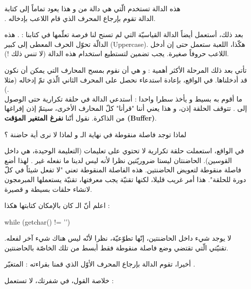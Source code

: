 هذه الدالة تستخدم
الّتي هي دالة من
و هذا يعود تماماً إلى كتابة\\
.
الدالة
تقوم بإرجاع المحرف الذي قام اللاعب بإدخاله.

بعد ذلك، أستعمل أيضاً الدالة القياسيّة التي لم تسنح لنا فرصة تعلّمها في كتابنا :
.
هذه الدالّة تحوّل الحرف المعطى إلى كبير
(\textenglish{Uppercase}).
هكّذا، اللعبة ستعمل حتى إن أدخل اللاعب حروفاً صغيرة. يجب تضمين
لتستطيع استخدام هذه الدالة (لا تنس ذلك !).

تأتي بعد ذلك المرحلة الأكثر أهمية : و هي أن نقوم بمسح المحارف التي يمكن أن نكون قد أدخلناها. في الواقع، بإعادة استدعاء
نحصل على المحرف الثاني الّذي تمّ إدخاله (مثلا
).\\
ما أقوم به بسيط و يأخذ سطرا واحدا : أستدعي الدالة
في حلقة تكرارية حتى الوصول إلى
.
تتوقف الحلقة إذن، و هذا يعني أننا "قرأنا" كلّ المحارف الأخرى، سيتمّ إذن إفراغها من الذاكرة. نقول أنّنا
\textbf{نفرغ المتغير المؤقت
(\textenglish{Buffer})}.

\begin{question}
لماذا توجد فاصلة منقوطة في نهاية الـ
و لماذا لا نرى أية حاضنة ؟
\end{question}

في الواقع، استعملت حلقة تكرارية لا تحتوي على تعليمات (التعليمة الوحيدة، هي
داخل القوسين). الحاضنتان ليستا ضروريّتين نظرا لأنه ليس لدينا ما نفعله غير
.
لهذا أضع فاصلة منقوطة لتعويض الحاضنتين. هذه الفاصلة المنقوطة تعني "لا تفعل شيئاً في كلّ دورة للحلقة". هذا أمر غريب قليلا، لكنها تقنيّة يجب معرفتها، تقنيّة يستعملها المبرمجون لانشاء حلقات بسيطة و قصيرة.

اعلم أنّ الـ
كان بالإمكان كتابتها هكذا :

\begin{Csource}
while (getchar() != '\n')
{

}
\end{Csource}

لا يوجد شيء داخل الحاضنتين، إنّها تطوّعيّة، نظرا لأنّه ليس هناك شيء آخر لفعله. تقنيّتي الّتي تقتضي وضع فاصلة منقوطة فقط أبسط من تلك الخاصّة بالحاضنتين.

أخيرا، تقوم الدالة
بإرجاع المحرف الأوّل الذي قمنا بقراءته : المتغيّر
.

خلاصة القول، في شفرتك، لا تستعمل :

